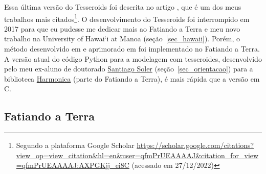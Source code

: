 \documentclass[10pt,a4paper,oneside]{book}
\newcommand{\UHM}{University of Hawai`i at M\={a}noa}
\begin{document}
Essa última versão do Tesseroids foi descrita no artigo \citet{Uieda2016}, que
é um dos meus trabalhos mais citados\footnote{Segundo a plataforma Google
Scholar
\url{https://scholar.google.com/citations?view_op=view_citation&hl=en&user=qfmPrUEAAAAJ&citation_for_view=qfmPrUEAAAAJ:AXPGKjj_ei8C}
(acessado em 27/12/2022)}.
O desenvolvimento do Tesseroids foi interrompido em 2017 para que eu pudesse me
dedicar mais ao Fatiando a Terra e meu novo trabalho na \UHM{}
(seção~\ref{sec_hawaii}).
Porém, o método desenvolvido em \citet{Uieda2016} e aprimorado em
\citet{Soler2019} foi implementado no Fatiando a Terra.
A versão atual do código Python para a modelagem com tesseroides, desenvolvido
pelo meu ex-aluno de doutorado \href{https://www.santisoler.com/}{Santiago
Soler} (seção~\ref{sec_orientacao}) para a biblioteca
\href{https://www.fatiando.org/harmonica/}{Harmonica} (parte do Fatiando a
Terra), é mais rápida que a versão em C.


\subsection{Fatiando a Terra}
\label{sec_fatiando}
\end{document}
